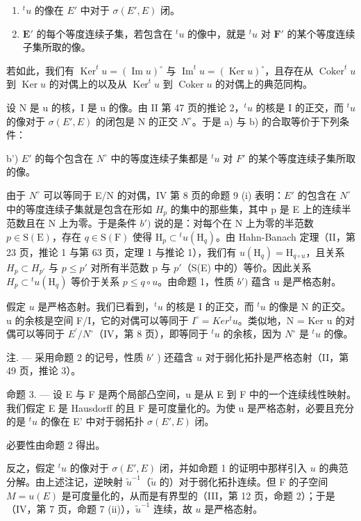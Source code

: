 \begin{enumerate}
\def\labelenumi{\alph{enumi})}
\item
  \(^{t}u\) 的像在 \(E'\) 中对于 \(\sigma(E', E)\) 闭。
\item
  \(\mathbf{E}'\) 的每个等度连续子集，若包含在 \({}^t u\) 的像中，就是 \({}^t u\) 对 \(\mathbf{F}'\) 的某个等度连续子集所取的像。
\end{enumerate}

若如此，我们有 \(\operatorname{Ker}^t u = (\operatorname{Im} u)^\circ\) 与 \(\operatorname{Im}^t u = (\operatorname{Ker} u)^\circ\)，且存在从 \(\operatorname{Coker}^t u\) 到 \(\operatorname{Ker} u\) 的对偶上的以及从 \(\operatorname{Ker}^t u\) 到 \(\operatorname{Coker} u\) 的对偶上的典范同构。

设 N 是 u 的核，I 是 u 的像。由 II 第 47 页的推论 2，\(^{t}u\) 的核是 I 的正交，而 \(^{t}u\) 的像对于 \(\sigma(E', E)\) 的闭包是 N 的正交 \(N^{\circ}\)。于是 a) 与 b) 的合取等价于下列条件：

b') \(E'\) 的每个包含在 \(N^{\circ}\) 中的等度连续子集都是 \(^{t}u\) 对 \(F'\) 的某个等度连续子集所取的像。

由于 \(N^{\circ}\) 可以等同于 E/N 的对偶，IV 第 8 页的命题 9 (i) 表明：\(E'\) 的包含在 \(N^{\circ}\) 中的等度连续子集就是包含在形如 \(H_{p}\) 的集中的那些集，其中 p 是 E 上的连续半范数且在 N 上为零。于是条件 \(b')\) 说的是：对每个在 N 上为零的半范数 \(p \in \mathrm{S}(\mathrm{E})\)，存在 \(q \in \mathrm{S}(\mathrm{F})\) 使得 \(\mathrm{H}_{p} \subset {}^{t}u(\mathrm{H}_{q})\)。由 Hahn-Banach 定理（II，第 23 页，推论 1 与第 63 页，定理 1 与推论 1），我们有 \(u(\mathrm{H}_{q}) = \mathrm{H}_{q \circ u}\)，且关系 \(H_{p} \subset H_{p'}\) 与 \(p \leqslant p'\) 对所有半范数 p 与 \(p'\)（S(E) 中的）等价。因此关系 \(H_{p} \subset {}^{t}u(\mathrm{H}_{q})\) 等价于关系 \(p \leqslant q \circ u\)。由命题 1，性质 \(b')\) 蕴含 u 是严格态射。

假定 \(u\) 是严格态射。我们已看到，\(^t u\) 的核是 I 的正交，而 \(^t u\) 的像是 N 的正交。u 的余核是空间 F/I，它的对偶可以等同于 \(I^{\circ} = Ker^{t}u\)。类似地，N = Ker u 的对偶可以等同于 \(E^{\prime}/N^{\circ}\)（IV，第 8 页），即等同于 \(^{t}u\) 的余核，因为 \(N^{\circ}\) 是 \(^{t}u\) 的像。

注. --- 采用命题 2 的记号，性质 \(b'\) ) 还蕴含 \(u\) 对于弱化拓扑是严格态射（II，第 49 页，推论 3）。

命题 3. --- 设 E 与 F 是两个局部凸空间，u 是从 E 到 F 中的一个连续线性映射。我们假定 E 是 Hausdorff 的且 F 是可度量化的。为使 u 是严格态射，必要且充分的是 \({}^t u\) 的像在 E' 中对于弱拓扑 \(\sigma(E', E)\) 闭。

必要性由命题 2 得出。

反之，假定 \(^t u\) 的像对于 \(\sigma(E', E)\) 闭，并如命题 1 的证明中那样引入 \(u\) 的典范分解。由上述注记，逆映射 \(\tilde{u}^{-1}\)（\(\tilde{u}\) 的）对于弱化拓扑连续。但 F 的子空间 \(M = u(E)\) 是可度量化的，从而是有界型的（III，第 12 页，命题 2）；于是（IV，第 7 页，命题 7 (ii)），\(\tilde{u}^{-1}\) 连续，故 \(u\) 是严格态射。
